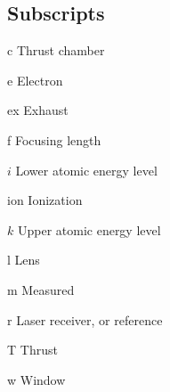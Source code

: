 \begin{multicols}{2}
    \section*{Subscripts}
    \begin{nomlist}
        \item[c]                Thrust chamber
        \item[e]                Electron
        \item[ex]               Exhaust
        \item[f]                Focusing length
        \item[$i$]              Lower atomic energy level 
        \item[ion]              Ionization
        \item[$k$]              Upper atomic energy level 
        \item[l]                Lens
        \item[m]                Measured
        \item[r]                Laser receiver, or reference
        \item[T]                Thrust
        \item[w]                Window
    \end{nomlist}


\end{multicols}